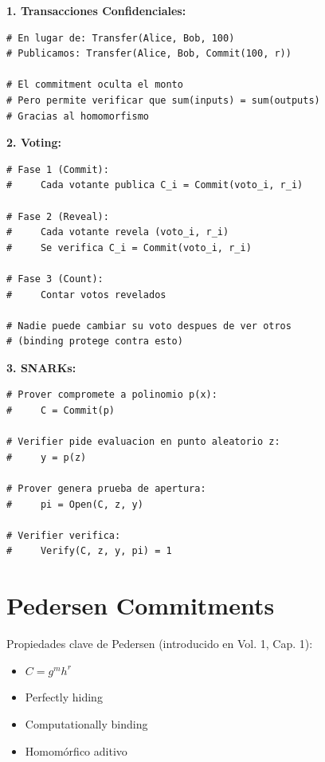 \documentclass[11pt,a4paper,twoside]{book}
\begin{document}
\begin{example}
\textbf{1. Transacciones Confidenciales:}
\begin{lstlisting}[style=python]
# En lugar de: Transfer(Alice, Bob, 100)
# Publicamos: Transfer(Alice, Bob, Commit(100, r))

# El commitment oculta el monto
# Pero permite verificar que sum(inputs) = sum(outputs)
# Gracias al homomorfismo
\end{lstlisting}

\textbf{2. Voting:}
\begin{lstlisting}[style=python]
# Fase 1 (Commit):
#     Cada votante publica C_i = Commit(voto_i, r_i)
    
# Fase 2 (Reveal):
#     Cada votante revela (voto_i, r_i)
#     Se verifica C_i = Commit(voto_i, r_i)
    
# Fase 3 (Count):
#     Contar votos revelados

# Nadie puede cambiar su voto despues de ver otros
# (binding protege contra esto)
\end{lstlisting}

\textbf{3. SNARKs:}
\begin{lstlisting}[style=python]
# Prover compromete a polinomio p(x):
#     C = Commit(p)
    
# Verifier pide evaluacion en punto aleatorio z:
#     y = p(z)
    
# Prover genera prueba de apertura:
#     pi = Open(C, z, y)
    
# Verifier verifica:
#     Verify(C, z, y, pi) = 1
\end{lstlisting}
\end{example}

\section{Pedersen Commitments}

Propiedades clave de Pedersen (introducido en Vol. 1, Cap. 1):
\begin{itemize}
    \item $C = g^m h^r$
    \item Perfectly hiding
    \item Computationally binding
    \item Homom\'orfico aditivo
\end{itemize}

\end{document}
